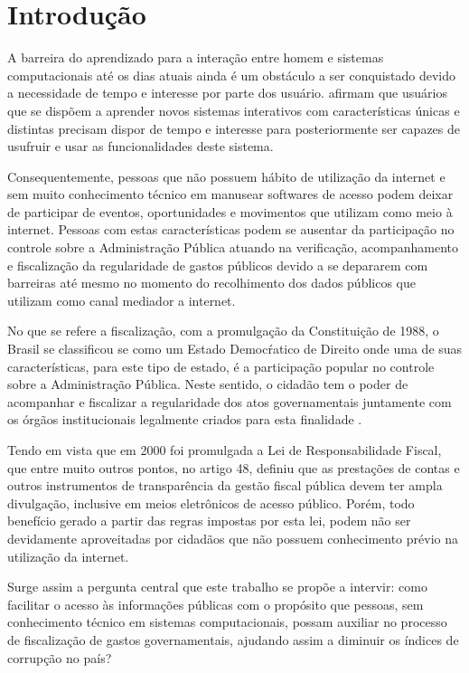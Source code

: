\chapter{Introdução}
A barreira do aprendizado para a interação entre homem e sistemas computacionais até os dias atuais ainda é um obstáculo a ser conquistado devido a necessidade de tempo e interesse por parte dos usuário. \cite{Barbosa:2010} afirmam que usuários que se dispõem a aprender novos sistemas interativos com características únicas e distintas precisam dispor de tempo e interesse para posteriormente ser capazes de usufruir e usar as funcionalidades deste sistema.

Consequentemente, pessoas que não possuem hábito de utilização da internet e sem muito conhecimento técnico em manusear softwares de acesso podem deixar de participar de eventos, oportunidades e movimentos que utilizam como meio à internet. Pessoas com estas características podem se ausentar da participação no controle sobre a Administração Pública atuando na verificação, acompanhamento e fiscalização da regularidade de gastos públicos devido a se depararem com barreiras até mesmo no momento do recolhimento dos dados públicos que utilizam como canal mediador a internet.

No que se refere a fiscalização, com a promulgação da Constituição de 1988, o Brasil se classificou se como um Estado Democŕatico de Direito onde uma de suas características, para este tipo de estado, é a participação popular no controle sobre a Administração Pública. Neste sentido, o cidadão tem o poder de acompanhar e fiscalizar a regularidade dos atos governamentais juntamente com os órgãos institucionais legalmente criados para esta finalidade \cite{Arruda:2010}.

Tendo em vista que em 2000 foi promulgada a Lei de Responsabilidade Fiscal, que entre muito outros pontos, no artigo 48, definiu que as prestações de contas e outros instrumentos de transparência da gestão fiscal pública devem ter ampla divulgação, inclusive em meios eletrônicos de acesso público. Porém, todo benefício gerado a partir das regras impostas por esta lei, podem não ser devidamente aproveitadas por cidadãos que não possuem conhecimento prévio na utilização da internet.

Surge assim a pergunta central que este trabalho se propõe a intervir: como facilitar o acesso às informações públicas com o propósito que pessoas, sem conhecimento técnico em sistemas computacionais, possam auxiliar no processo de fiscalização de gastos governamentais, ajudando assim a diminuir os índices de corrupção no país?

